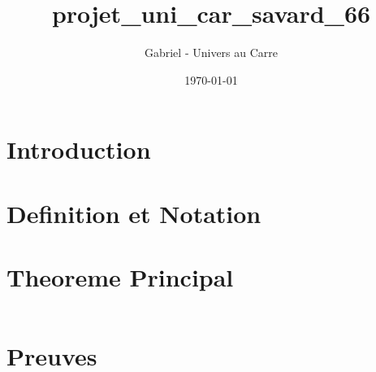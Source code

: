 \documentclass[12pt]{article}
\title{projet_uni_car_savard_66}
\author{Gabriel - Univers au Carre}
\date{\today}
\begin{document}
\maketitle


\section{Introduction}



\section{Definition et Notation}



\section{Theoreme Principal}


\begin{equation}
\end{equation}


\section{Preuves}


\end{document}
